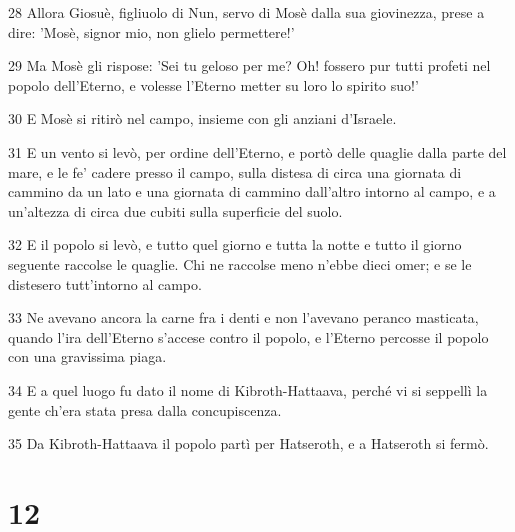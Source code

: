 \par 28 Allora Giosuè, figliuolo di Nun, servo di Mosè dalla sua giovinezza, prese a dire: 'Mosè, signor mio, non glielo permettere!'
\par 29 Ma Mosè gli rispose: 'Sei tu geloso per me? Oh! fossero pur tutti profeti nel popolo dell'Eterno, e volesse l'Eterno metter su loro lo spirito suo!'
\par 30 E Mosè si ritirò nel campo, insieme con gli anziani d'Israele.
\par 31 E un vento si levò, per ordine dell'Eterno, e portò delle quaglie dalla parte del mare, e le fe' cadere presso il campo, sulla distesa di circa una giornata di cammino da un lato e una giornata di cammino dall'altro intorno al campo, e a un'altezza di circa due cubiti sulla superficie del suolo.
\par 32 E il popolo si levò, e tutto quel giorno e tutta la notte e tutto il giorno seguente raccolse le quaglie. Chi ne raccolse meno n'ebbe dieci omer; e se le distesero tutt'intorno al campo.
\par 33 Ne avevano ancora la carne fra i denti e non l'avevano peranco masticata, quando l'ira dell'Eterno s'accese contro il popolo, e l'Eterno percosse il popolo con una gravissima piaga.
\par 34 E a quel luogo fu dato il nome di Kibroth-Hattaava, perché vi si seppellì la gente ch'era stata presa dalla concupiscenza.
\par 35 Da Kibroth-Hattaava il popolo partì per Hatseroth, e a Hatseroth si fermò.

\chapter{12}

